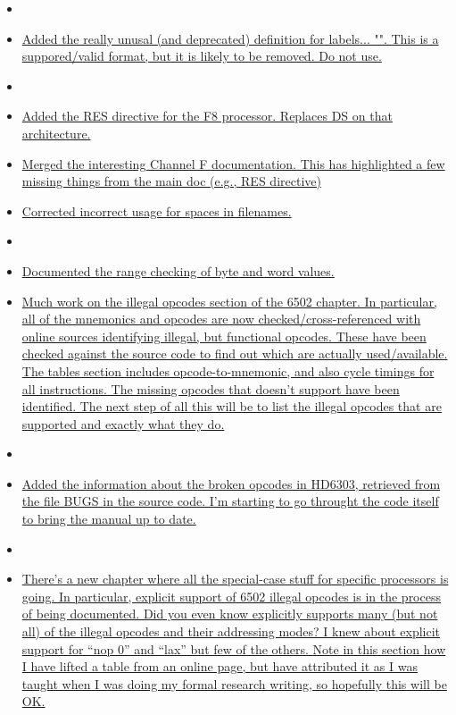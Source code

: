 \begin{itemize}
\item[]
\item \hyperref[changelog:20200907deprecated]{Added the really unusal (and deprecated) definition for labels... "". This is a suppored/valid format, but it is likely to be removed. Do not use.}

\item[]
\item \hyperref[changelog:20200906res]{Added the RES directive for the F8 processor. Replaces DS on that architecture.}
\item \hyperref[changelog:20200906f8]{Merged the interesting Channel F documentation. This has highlighted a few missing things from the main doc (e.g., RES directive)}
\item \hyperref[changelog:20200906spaces]{Corrected incorrect usage for spaces in filenames.}
\item[]
\item \hyperref[changelog:20200905range]{Documented the range checking of byte and word values.}
\item \hyperref[changelog:20200904illegal]{Much work on the illegal opcodes section of the 6502 chapter. In particular, all of the mnemonics and opcodes are now checked/cross-referenced with online sources identifying illegal, but functional opcodes. These have been checked against the \dasm source code to find out which are actually used/available. The tables section includes opcode-to-mnemonic, and also cycle timings for all instructions. The missing opcodes that \dasm doesn't support have been identified. The next step of all this will be to list the illegal opcodes that are supported and exactly what they do.}
\item[]
\item \hyperref[changelog:20200903bug]{Added the information about the broken opcodes in HD6303, retrieved from the file BUGS in the source code. I'm starting to go throught the code itself to bring the manual up to date.}
\item[]
\item \hyperref[changelog20200901_nop3]{There's a new chapter where all the special-case stuff for specific processors is going. In particular, explicit support of 6502 illegal opcodes is in the process of being documented. Did you even know \dasm explicitly supports many (but not all) of the illegal opcodes and their addressing modes? I knew about explicit support for ``nop 0'' and ``lax'' but few of the others. Note in this section how I have lifted a table from an online page, but have attributed it as I was taught when I was doing my formal research writing, so hopefully this will be OK.}

\end{itemize}
